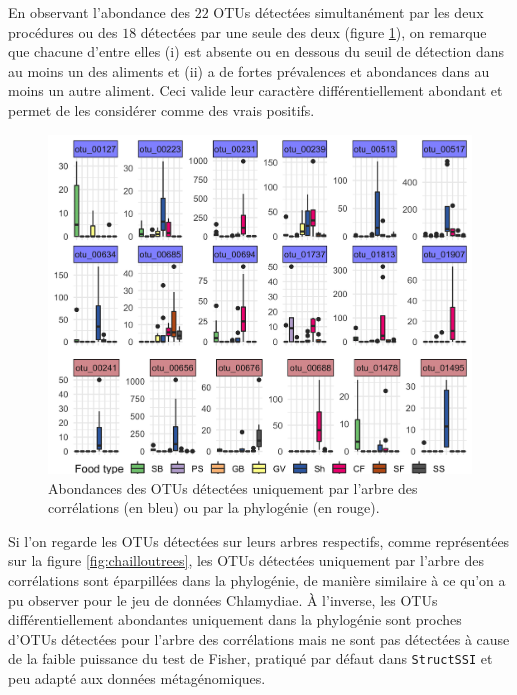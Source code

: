 \documentclass[12pt,a4paper]{reedthesis}
\theoremstyle{definition}
\theoremstyle{definition}
\theoremstyle{definition}
\theoremstyle{remark}
\begin{document}
En observant l'abondance des \(22\) OTUs détectées simultanément par les deux procédures ou des \(18\) détectées par une seule des deux (figure \ref{fig:chailloubp}), on remarque que chacune d'entre elles (i) est absente ou en dessous du seuil de détection dans au moins un des aliments et (ii) a de fortes prévalences et abondances dans au moins un autre aliment. Ceci valide leur caractère différentiellement abondant et permet de les considérer comme des vrais positifs.


\begin{figure}

{\centering \includegraphics[width=0.9\linewidth]{img/chaillou_bp} 

}

\caption{Abondances des OTUs détectées uniquement par l'arbre des corrélations (en bleu) ou par la phylogénie (en rouge).}\label{fig:chailloubp}
\end{figure}
Si l'on regarde les OTUs détectées sur leurs arbres respectifs, comme représentées sur la figure \ref{fig:chailloutrees}, les OTUs détectées uniquement par l'arbre des corrélations sont éparpillées dans la phylogénie, de manière similaire à ce qu'on a pu observer pour le jeu de données Chlamydiae. À l'inverse, les OTUs différentiellement abondantes uniquement dans la phylogénie sont proches d'OTUs détectées pour l'arbre des corrélations mais ne sont pas détectées à cause de la faible puissance du test de Fisher, pratiqué par défaut dans \texttt{StructSSI} et peu adapté aux données métagénomiques.
\end{document}
